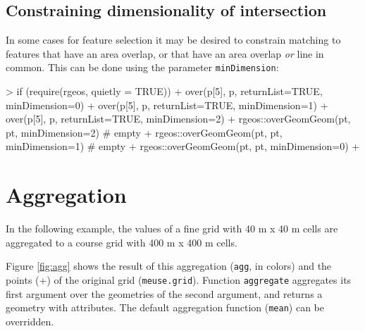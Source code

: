 \documentclass{article}
\newcommand{\code}[1]{{\tt #1}}
\begin{document}

\subsection{Constraining dimensionality of intersection}
\label{dim}

In some cases for feature selection it may be desired to constrain
matching to features that have an area overlap, or that have an
area overlap {\em or} line in common. This can be done using the
parameter \code{minDimension}:

\begin{Schunk}
\begin{Sinput}
> if (require(rgeos, quietly = TRUE)) {
+ over(p[5], p, returnList=TRUE, minDimension=0)
+ over(p[5], p, returnList=TRUE, minDimension=1)
+ over(p[5], p, returnList=TRUE, minDimension=2)
+ rgeos::overGeomGeom(pt, pt, minDimension=2) # empty
+ rgeos::overGeomGeom(pt, pt, minDimension=1) # empty
+ rgeos::overGeomGeom(pt, pt, minDimension=0)
+ }
\end{Sinput}
\end{Schunk}

\section{Aggregation}
In the following example, the values of a fine grid with 40 m x 40
m cells are aggregated to a course grid with 400 m x 400 m cells.
\begin{Schunk}
\end{Schunk}
Figure \ref{fig:agg} shows the result of this aggregation
(\code{agg}, in colors) and the points (+) of the original grid
(\code{meuse.grid}). Function \code{aggregate} aggregates its first
argument over the geometries of the second argument, and returns
a geometry with attributes.  The default aggregation function
(\code{mean}) can be overridden.
\end{document}
